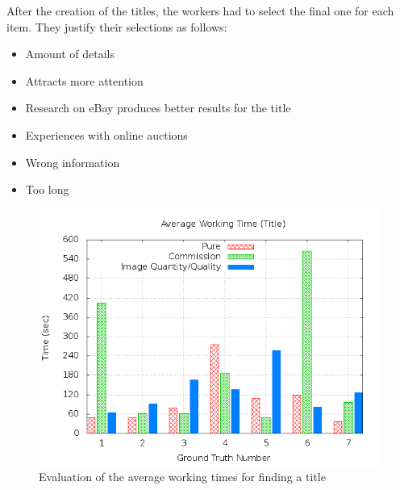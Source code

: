 After the creation of the titles, the workers had to select the final one for each item. They justify their selections as follows:
\begin{itemize}
	\item Amount of details 
	\item Attracts more attention 
	\item Research on eBay produces better results for the title 
	\item Experiences with online auctions 
	\item Wrong information 
	\item Too long 
\end{itemize}
\begin{figure}
\centering
\includegraphics[scale=0.55]{images/plots/crowdsourcing/plot_time_title.png}
\caption{Evaluation of the average working times for finding a title}
\label{crowdsourcing_time_title}
\end{figure}
